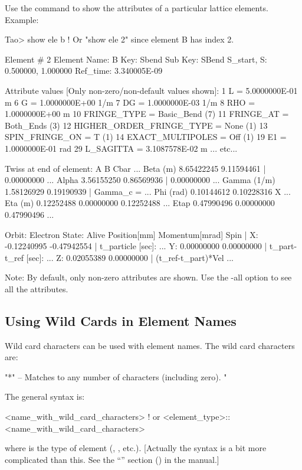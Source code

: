 \documentclass{hitec}     %
\begin{document}
Use the  command to show the attributes of a particular lattice elements. Example:
\begin{code} 
Tao> show ele b   ! Or "show ele 2" since element B has index 2.

 Element #                2
 Element Name: B
 Key: Sbend
 Sub Key: SBend
 S_start, S:    0.500000,    1.000000
 Ref_time:  3.340005E-09

 Attribute values [Only non-zero/non-default values shown]:
    1   L                            =  5.0000000E-01 m
    6   G                            =  1.0000000E+00 1/m
    7   DG                           =  1.0000000E-03 1/m
    8   RHO                          =  1.0000000E+00 m
   10   FRINGE_TYPE                  =  Basic_Bend (7)
   11   FRINGE_AT                    =  Both_Ends (3)
   12   HIGHER_ORDER_FRINGE_TYPE     =  None (1)
   13   SPIN_FRINGE_ON               =  T (1)
   14   EXACT_MULTIPOLES             =  Off (1)
   19   E1                           =  1.0000000E-01 rad
   29   L_SAGITTA                    =  3.1087578E-02 m
     ... etc...

Twiss at end of element:
                          A              B            Cbar    ...
  Beta (m)         8.65422245     9.11594461  |   0.00000000  ...
  Alpha            3.56155250     0.86569936  |   0.00000000  ... 
  Gamma (1/m)      1.58126929     0.19190939  |   Gamma_c =   ...
  Phi (rad)        0.10144612     0.10228316            X     ...
  Eta (m)          0.12252488     0.00000000     0.12252488   ...
  Etap             0.47990496     0.00000000     0.47990496   ...

Orbit:  Electron   State: Alive
         Position[mm] Momentum[mrad]        Spin   |
  X:      -0.12240995    -0.47942554               | t_particle [sec]:   ...
  Y:       0.00000000     0.00000000               | t_part-t_ref [sec]: ...
  Z:       0.02055389     0.00000000               | (t_ref-t_part)*Vel  ...
\end{code}
Note: By default, only non-zero attributes are shown. Use the -all option to see all the attributes.

\newpage

\subsection{Using Wild Cards in Element Names}
\label{s:wild}

Wild card characters can be used with element names. The wild card characters  are:
\begin{code}
"*" -- Matches to any number of characters (including zero).
"%
\end{code}
The general syntax is:
\begin{code}
  <name_with_wild_card_characters>                  ! or
  <element_type>::<name_with_wild_card_characters>
\end{code}
where  is the type of element (, , etc.). [Actually the
syntax is a bit more complicated than this. See the ``'' section () in the \bmad manual.]
\end{document}
